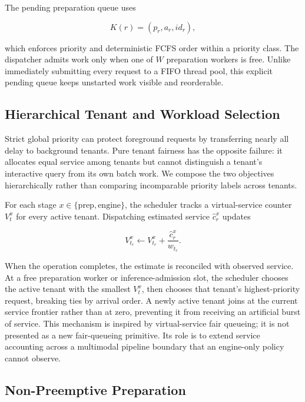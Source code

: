 \documentclass[sigconf,review,anonymous]{acmart}
\begin{document}
The pending preparation queue uses

\begin{equation}
K(r) = (p_r, a_r, id_r),
\end{equation}

which enforces priority and deterministic FCFS order within a priority class.
The dispatcher admits work only when one of $W$ preparation workers is free.
Unlike immediately submitting every request to a FIFO thread pool, this
explicit pending queue keeps unstarted work visible and reorderable.

\subsection{Hierarchical Tenant and Workload Selection}

Strict global priority can protect foreground requests by transferring nearly
all delay to background tenants. Pure tenant fairness has the opposite
failure: it allocates equal service among tenants but cannot distinguish a
tenant's interactive query from its own batch work. We compose the two
objectives hierarchically rather than comparing incomparable priority labels
across tenants.

For each stage $x\in\{\mathrm{prep},\mathrm{engine}\}$, the scheduler tracks a
virtual-service counter $V_t^x$ for every active tenant. Dispatching estimated
service $\widehat{c}_r^x$ updates

\begin{equation}
V_{t_r}^x \leftarrow V_{t_r}^x +
\frac{\widehat{c}_r^x}{w_{t_r}}.
\end{equation}

When the operation completes, the estimate is reconciled with observed
service. At a free preparation worker or inference-admission slot, the
scheduler chooses the active tenant with the smallest $V_t^x$, then chooses
that tenant's highest-priority request, breaking ties by arrival order. A
newly active tenant joins at the current service frontier rather than at zero,
preventing it from receiving an artificial burst of service. This mechanism
is inspired by virtual-service fair queueing; it is not presented as a new
fair-queueing primitive. Its role is to extend service accounting across a
multimodal pipeline boundary that an engine-only policy cannot observe.

\subsection{Non-Preemptive Preparation}
\end{document}
